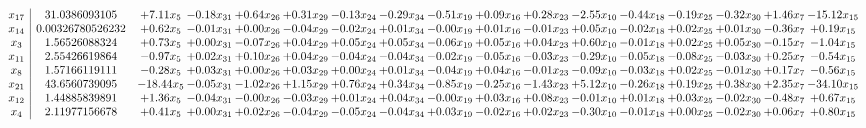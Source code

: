 \documentclass[9pt]{article}
\begin{document}
 \[\begin{array}{c| c c@{\hskip 2pt} c@{\hskip 2pt} c@{\hskip 2pt} c@{\hskip 2pt} c@{\hskip 2pt} c@{\hskip 2pt} c@{\hskip 2pt} c@{\hskip 2pt} c@{\hskip 2pt} c@{\hskip 2pt} c@{\hskip 2pt} c@{\hskip 2pt} c@{\hskip 2pt} c@{\hskip 2pt} c@{\hskip 2pt} }
 x_{17}   &  31.0386093105 & +  7.11 x_{5} & -0.18 x_{31} & +  0.64 x_{26} & +  0.31 x_{29} & -0.13 x_{24} & -0.29 x_{34} & -0.51 x_{19} & +  0.09 x_{16} & +  0.28 x_{23} & -2.55 x_{10} & -0.44 x_{18} & -0.19 x_{25} & -0.32 x_{30} & +  1.46 x_{7} & -15.12 x_{15}\\
 x_{14}   &  0.00326780526232 & +  0.62 x_{5} & -0.01 x_{31} & +  0.00 x_{26} & -0.04 x_{29} & -0.02 x_{24} & +  0.01 x_{34} & -0.00 x_{19} & +  0.01 x_{16} & -0.01 x_{23} & +  0.05 x_{10} & -0.02 x_{18} & +  0.02 x_{25} & +  0.01 x_{30} & -0.36 x_{7} & +  0.19 x_{15}\\
 x_{3}   &  1.56526088324 & +  0.73 x_{5} & +  0.00 x_{31} & -0.07 x_{26} & +  0.04 x_{29} & +  0.05 x_{24} & +  0.05 x_{34} & -0.06 x_{19} & +  0.05 x_{16} & +  0.04 x_{23} & +  0.60 x_{10} & -0.01 x_{18} & +  0.02 x_{25} & +  0.05 x_{30} & -0.15 x_{7} & -1.04 x_{15}\\
 x_{11}   &  2.55426619864 & -0.97 x_{5} & +  0.02 x_{31} & +  0.10 x_{26} & +  0.04 x_{29} & -0.04 x_{24} & -0.04 x_{34} & -0.02 x_{19} & -0.05 x_{16} & -0.03 x_{23} & -0.29 x_{10} & -0.05 x_{18} & -0.08 x_{25} & -0.03 x_{30} & +  0.25 x_{7} & -0.54 x_{15}\\
 x_{8}   &  1.57166119111 & -0.28 x_{5} & +  0.03 x_{31} & +  0.00 x_{26} & +  0.03 x_{29} & +  0.00 x_{24} & +  0.01 x_{34} & -0.04 x_{19} & +  0.04 x_{16} & -0.01 x_{23} & -0.09 x_{10} & -0.03 x_{18} & +  0.02 x_{25} & -0.01 x_{30} & +  0.17 x_{7} & -0.56 x_{15}\\
 x_{21}   &  43.6560739095 & -18.44 x_{5} & -0.05 x_{31} & -1.02 x_{26} & +  1.15 x_{29} & +  0.76 x_{24} & +  0.34 x_{34} & -0.85 x_{19} & -0.25 x_{16} & -1.43 x_{23} & +  5.12 x_{10} & -0.26 x_{18} & +  0.19 x_{25} & +  0.38 x_{30} & +  2.35 x_{7} & -34.10 x_{15}\\
 x_{12}   &  1.44885839891 & +  1.36 x_{5} & -0.04 x_{31} & -0.00 x_{26} & -0.03 x_{29} & +  0.01 x_{24} & +  0.04 x_{34} & -0.00 x_{19} & +  0.03 x_{16} & +  0.08 x_{23} & -0.01 x_{10} & +  0.01 x_{18} & +  0.03 x_{25} & -0.02 x_{30} & -0.48 x_{7} & +  0.67 x_{15}\\
 x_{4}   &  2.11977156678 & +  0.41 x_{5} & +  0.00 x_{31} & +  0.02 x_{26} & -0.04 x_{29} & -0.05 x_{24} & -0.04 x_{34} & +  0.03 x_{19} & -0.02 x_{16} & +  0.02 x_{23} & -0.30 x_{10} & -0.01 x_{18} & +  0.00 x_{25} & -0.02 x_{30} & +  0.06 x_{7} & +  0.80 x_{15}\\

\end{array}\]
\end{document}
